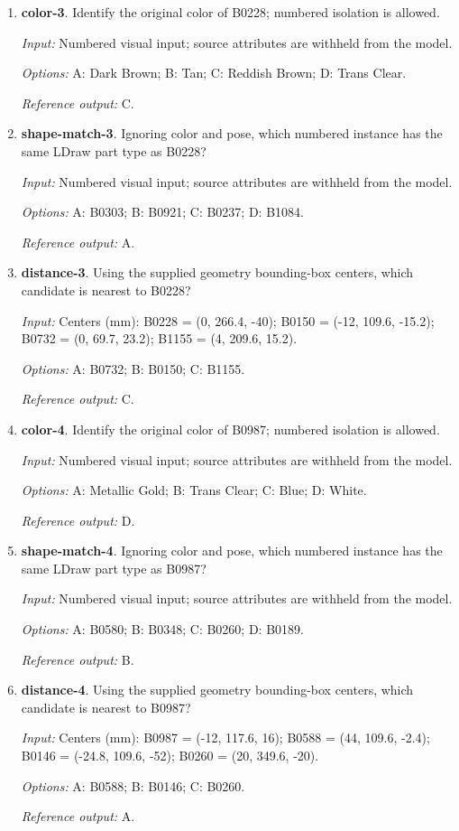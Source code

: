 \begin{enumerate}
\item \textbf{color-3}. Identify the original color of B0228; numbered isolation is allowed.\par {\small \textit{Input:} Numbered visual input; source attributes are withheld from the model. \par\textit{Options:} A: Dark Brown; B: Tan; C: Reddish Brown; D: Trans Clear. \par\textit{Reference output:} C.}
\item \textbf{shape-match-3}. Ignoring color and pose, which numbered instance has the same LDraw part type as B0228?\par {\small \textit{Input:} Numbered visual input; source attributes are withheld from the model. \par\textit{Options:} A: B0303; B: B0921; C: B0237; D: B1084. \par\textit{Reference output:} A.}
\item \textbf{distance-3}. Using the supplied geometry bounding-box centers, which candidate is nearest to B0228?\par {\small \textit{Input:} Centers (mm): B0228 = (0, 266.4, -40); B0150 = (-12, 109.6, -15.2); B0732 = (0, 69.7, 23.2); B1155 = (4, 209.6, 15.2). \par\textit{Options:} A: B0732; B: B0150; C: B1155. \par\textit{Reference output:} C.}
\item \textbf{color-4}. Identify the original color of B0987; numbered isolation is allowed.\par {\small \textit{Input:} Numbered visual input; source attributes are withheld from the model. \par\textit{Options:} A: Metallic Gold; B: Trans Clear; C: Blue; D: White. \par\textit{Reference output:} D.}
\item \textbf{shape-match-4}. Ignoring color and pose, which numbered instance has the same LDraw part type as B0987?\par {\small \textit{Input:} Numbered visual input; source attributes are withheld from the model. \par\textit{Options:} A: B0580; B: B0348; C: B0260; D: B0189. \par\textit{Reference output:} B.}
\item \textbf{distance-4}. Using the supplied geometry bounding-box centers, which candidate is nearest to B0987?\par {\small \textit{Input:} Centers (mm): B0987 = (-12, 117.6, 16); B0588 = (44, 109.6, -2.4); B0146 = (-24.8, 109.6, -52); B0260 = (20, 349.6, -20). \par\textit{Options:} A: B0588; B: B0146; C: B0260. \par\textit{Reference output:} A.}

\end{enumerate}
